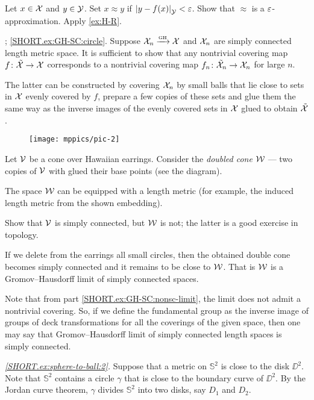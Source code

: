 Let $x\in\mathcal{X}$ and $y\in\mathcal{Y}$.
Set $x\approx y$ if $\dist{y}{f(x)}{\spc{Y}}<\eps$.
Show that $\approx$ is a $\varepsilon$-approximation. 
Apply \ref{ex:H-R}.

\parbf{\ref{ex:GH-SC}}; \ref{SHORT.ex:GH-SC:circle}.
Suppose $\mathcal{X}_n\xrightarrow{\mbox{\tiny\rm GH}} \mathcal{X}$ and $\mathcal{X}_n$ are simply connected length metric space.
It is sufficient to show that any nontrivial covering map $f\colon\tilde{\mathcal{X}}\to \mathcal{X}$ corresponds to a nontrivial covering map $f_n\colon\tilde{\mathcal{X}}_n\to \mathcal{X}_n$ for large $n$.

The latter can be constructed by covering $\mathcal{X}_n$ by small balls that lie close to sets in $\mathcal{X}$ evenly covered by $f$, prepare a few copies of these sets and glue them the same way as the inverse images of the evenly covered sets in $\mathcal{X}$ glued to obtain $\tilde{\mathcal{X}}$.

\begin{wrapfigure}{r}{40 mm}
\vskip-0mm
\centering
\texttt{[image: mppics/pic-2]}
\end{wrapfigure}

Let $\mathcal{V}$ be a cone over Hawaiian earrings.
Consider the {}\emph{doubled cone} $\mathcal{W}$ --- two copies of $\mathcal{V}$ with glued their base points (see the diagram).

The space $\mathcal{W}$ can be equipped with a length metric
(for example, the induced length metric from the shown embedding).

Show that $\mathcal{V}$ is simply connected, but $\mathcal{W}$ is not; the latter is a good exercise in topology.

If we delete from the earrings all small circles, then the obtained double cone becomes simply connected and it remains to be close to $\mathcal{W}$.
That is $\mathcal{W}$ is a Gromov--Hausdorff limit of simply connected spaces.

Note that from part \ref{SHORT.ex:GH-SC:nonsc-limit}, the limit does not admit a nontrivial covering.
So, if we define the fundamental group as the inverse image of groups of deck transformations for all the coverings of the given space, then one may say that Gromov--Hausdorff limit of simply connected length spaces is simply connected.

\parbf{\ref{ex:sphere-to-ball},}
\textit{\ref{SHORT.ex:sphere-to-ball:2}.}
Suppose that a metric on $\mathbb{S}^2$ is close to the disk $\DD^2$.
Note that $\mathbb{S}^2$ contains a circle $\gamma$ that is close to the boundary curve of $\DD^2$.
By the Jordan curve theorem, $\gamma$ divides $\mathbb{S}^2$ into two disks, say $D_1$ and $D_2$.

